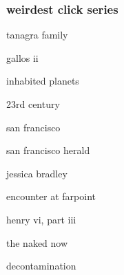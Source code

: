 \documentclass{beamer}
\begin{document}
\begin{frame}
  \frametitle{weirdest click series}

  tanagra family

  gallos ii

  inhabited planets

  23rd century

  san francisco

  san francisco herald

  jessica bradley

  encounter at farpoint

  henry vi, part iii

  the naked now

  decontamination

\end{frame}
\end{document}
